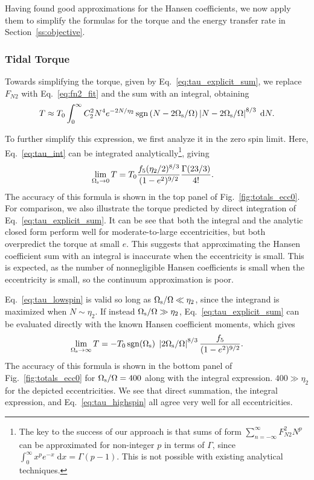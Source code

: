 \documentclass[
        fleqn,
        usenatbib,
    ]{mnras}
\DeclareMathOperator*{\sgn}{sgn}
\begin{document}
Having found good approximations for the Hansen coefficients, we now apply them
to simplify the formulas for the torque and the energy transfer rate in
Section~\ref{ss:objective}.

\subsubsection{Tidal Torque}\label{ss:torque_eval}

Towards simplifying the torque, given by Eq.~\eqref{eq:tau_explicit_sum}, we
replace $F_{N2}$ with Eq.~\eqref{eq:fn2_fit} and the sum with an integral,
obtaining
\begin{equation}
    T \approx T_0 \int_0^\infty C_2^2 N^4 e^{-2N / \eta_2}
        \sgn\left(N - 2\Omega_{\rm s} / \Omega\right) \left|N - 2 \Omega_{\rm s} /
            \Omega\right|^{8/3}\;\mathrm{d}N.\label{eq:tau_int}
\end{equation}

To further simplify this expression, we first analyze it in the zero spin limit.
Here, Eq.~\eqref{eq:tau_int} can be integrated analytically\footnote{The key to
the success of our approach is that sums of form $\sum_{n = -\infty}^\infty
F_{N2}^2 N^p$ can be approximated for non-integer $p$ in terms of $\Gamma$,
since $\int_0^\infty x^pe^{-x}\;\mathrm{d}x = \Gamma(p - 1)$. This is not
possible with existing analytical techniques.}, giving
\begin{align}
    \lim_{\Omega_{\rm s} \to 0} T &= T_0 \frac{f_5 (\eta_2/2)^{8/3}}{(1 -
        e^2)^{9/2}} \frac{\Gamma(23/3)}{4!}.\label{eq:tau_lowspin}
\end{align}
The accuracy of this formula is shown in the top panel of
Fig.~\ref{fig:totals_ecc0}. For comparison, we also illustrate the torque
predicted by direct integration of Eq.~\eqref{eq:tau_explicit_sum}. It can be
see that both the integral and the analytic closed form perform well for
moderate-to-large eccentricities, but both overpredict the torque at small $e$.
This suggests that approximating the Hansen coefficient sum with an integral is
inaccurate when the eccentricity is small. This is expected, as the number of
nonnegligible Hansen coefficients is small when the eccentricity is small, so
the continuum approximation is poor.

Eq.~\eqref{eq:tau_lowspin} is valid so long as $\Omega_{\rm s} / \Omega \ll
\eta_2$, since the integrand is maximized when $N \sim \eta_2$. If instead
$\Omega_{\rm s} / \Omega \gg \eta_2$, Eq.~\eqref{eq:tau_explicit_sum} can be
evaluated directly with the known Hansen coefficient moments, which gives
\begin{equation}
    \lim_{\Omega_{\rm s} \to \infty} T = -T_0 \sgn (\Omega_{\rm s})\;\left|2
        \Omega_{\rm s} / \Omega\right|^{8/3} \frac{f_5}{(1 -
        e^2)^{9/2}}.\label{eq:tau_highspin}
\end{equation}
The accuracy of this formula is shown in the bottom panel of
Fig.~\ref{fig:totals_ecc0} for $\Omega_{\rm s} / \Omega = 400$ along with the
integral expression. $400 \gg \eta_2$ for the depicted eccentricities. We see
that direct summation, the integral expression, and Eq.~\eqref{eq:tau_highspin}
all agree very well for all eccentricities.
\end{document}
